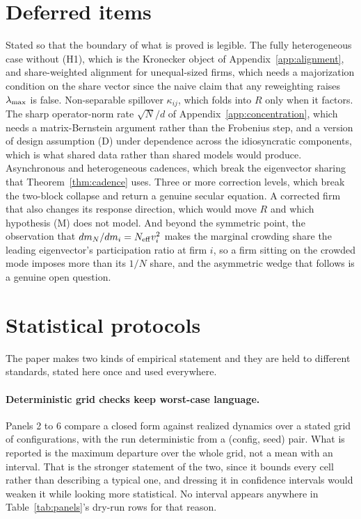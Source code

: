 \section{Deferred items}
\label{app:deferred}

Stated so that the boundary of what is proved is legible. The fully heterogeneous case without (H1), which is the Kronecker object of Appendix~\ref{app:alignment}, and share-weighted alignment for unequal-sized firms, which needs a majorization condition on the share vector since the naive claim that any reweighting raises $\lambda_{\max}$ is false. Non-separable spillover $\kappa_{ij}$, which folds into $R$ only when it factors. The sharp operator-norm rate $\sqrt{N}/d$ of Appendix~\ref{app:concentration}, which needs a matrix-Bernstein argument rather than the Frobenius step, and a version of design assumption (D) under dependence across the idiosyncratic components, which is what shared data rather than shared models would produce. Asynchronous and heterogeneous cadences, which break the eigenvector sharing that Theorem~\ref{thm:cadence} uses. Three or more correction levels, which break the two-block collapse and return a genuine secular equation. A corrected firm that also changes its response direction, which would move $R$ and which hypothesis (M) does not model. And beyond the symmetric point, the observation that $dm_N/dm_i = N_{\mathrm{eff}} v_i^2$ makes the marginal crowding share the leading eigenvector's participation ratio at firm $i$, so a firm sitting on the crowded mode imposes more than its $1/N$ share, and the asymmetric wedge that follows is a genuine open question.

\section{Statistical protocols}
\label{app:statistics}

The paper makes two kinds of empirical statement and they are held to different standards, stated here once and used everywhere.

\paragraph{Deterministic grid checks keep worst-case language.} Panels 2 to 6 compare a closed form against realized dynamics over a stated grid of configurations, with the run deterministic from a (config, seed) pair. What is reported is the maximum departure over the whole grid, not a mean with an interval. That is the stronger statement of the two, since it bounds every cell rather than describing a typical one, and dressing it in confidence intervals would weaken it while looking more statistical. No interval appears anywhere in Table~\ref{tab:panels}'s dry-run rows for that reason.

